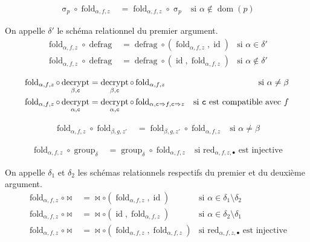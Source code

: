 \documentclass[french]{article}
\DeclareMathOperator{\sel}{\sigma}
\DeclareMathOperator{\defrag}{defrag}
\DeclareMathOperator{\decrypt}{decrypt}
\DeclareMathOperator{\group}{group}
\DeclareMathOperator{\id}{id}
\DeclareMathOperator{\dom}{dom}
\DeclareMathOperator{\redu}{red}
\newcommand\typeT[1]{\text{\ttfamily #1}}
\newcommand{\decryptArgs}[2]{\decrypt_{#1 , \typeT{#2}}}
\newcommand{\selP}{\sel_p}
\newcommand{\decryptCAlpha}{\decryptArgs{\alpha}{c}}
\newcommand{\groupDelta}{\group_{\delta}}
\newcommand{\fold}[3]{\operatorname{fold}_{#1, #2, #3}}
\newcommand{\foldAlphafz}{\fold{\alpha}{f}{z}}
\begin{document}
\begin{align}
\selP \circ \foldAlphafz & = \foldAlphafz \circ \selP
& \text{si $\alpha \notin \dom(p)$}
\end{align}

On appelle $\delta'$ le schéma relationnel du premier argument.
\begin{align}
\foldAlphafz \circ \defrag
& = \defrag \circ (\foldAlphafz, \id)
& \text{si $\alpha \in \delta'$} \\
\foldAlphafz \circ \defrag
& = \defrag \circ (\id, \foldAlphafz)
& \text{si $\alpha \notin \delta'$}
\end{align}

\begin{align}
\foldAlphafz \circ \decryptArgs{\beta}{c}
& = \decryptArgs{\beta}{c} \circ \foldAlphafz
& \text{si $\alpha \neq \beta$} \\
\foldAlphafz \circ \decryptCAlpha
& = \decryptCAlpha \circ \fold{\alpha}{\typeT{c} \Rightarrow f}{\typeT{c} \Rightarrow z}
& \text{si $\typeT{c}$ est compatible avec $f$}
\end{align}

\begin{align}
\foldAlphafz \circ \fold{\beta}{g}{z'}
& = \fold{\beta}{g}{z'} \circ \foldAlphafz
& \text{si $\alpha \neq \beta$}
\end{align}

\begin{align}
\foldAlphafz \circ \groupDelta
& = \groupDelta \circ \foldAlphafz
& \text{si $\redu_{\alpha, f, z, \bullet}$ est injective}
\end{align}

On appelle $\delta_1$ et $\delta_2$
les schémas relationnels respectifs du
premier et du deuxième argument.
\begin{align}
\foldAlphafz \circ \Join
& = \Join \circ (\foldAlphafz, \id)
& \text{si $\alpha \in \delta_1 \setminus \delta_2$} \\
\foldAlphafz \circ \Join
& = \Join \circ (\id, \foldAlphafz)
& \text{si $\alpha \in \delta_2 \setminus \delta_1$} \\
\foldAlphafz \circ \Join
& = \Join \circ (\foldAlphafz, \foldAlphafz)
& \text{si $\redu_{\alpha, f, z, \bullet}$ est injective}
\end{align}
\end{document}
